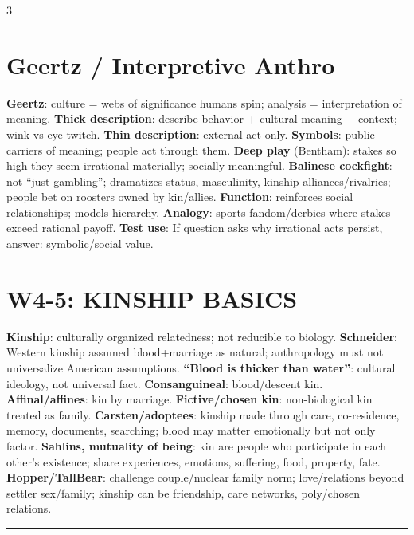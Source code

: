 \documentclass[10pt,landscape]{article}
\newcommand{\kw}[1]{\textbf{#1}}
\newcommand{\sep}{\vspace{0.8pt}\hrule\vspace{0.8pt}}
\begin{document}
\begin{multicols}{3}
\section*{Geertz / Interpretive Anthro}
\kw{Geertz}: culture = webs of significance humans spin; analysis = interpretation of meaning. \kw{Thick description}: describe behavior + cultural meaning + context; wink vs eye twitch. \kw{Thin description}: external act only. \kw{Symbols}: public carriers of meaning; people act through them. \kw{Deep play} (Bentham): stakes so high they seem irrational materially; socially meaningful. \kw{Balinese cockfight}: not ``just gambling''; dramatizes status, masculinity, kinship alliances/rivalries; people bet on roosters owned by kin/allies. \kw{Function}: reinforces social relationships; models hierarchy. \kw{Analogy}: sports fandom/derbies where stakes exceed rational payoff. \kw{Test use}: If question asks why irrational acts persist, answer: symbolic/social value.

\section*{W4-5: KINSHIP BASICS}
\kw{Kinship}: culturally organized relatedness; not reducible to biology. \kw{Schneider}: Western kinship assumed blood+marriage as natural; anthropology must not universalize American assumptions. \kw{``Blood is thicker than water''}: cultural ideology, not universal fact. \kw{Consanguineal}: blood/descent kin. \kw{Affinal/affines}: kin by marriage. \kw{Fictive/chosen kin}: non-biological kin treated as family. \kw{Carsten/adoptees}: kinship made through care, co-residence, memory, documents, searching; blood may matter emotionally but not only factor. \kw{Sahlins, mutuality of being}: kin are people who participate in each other's existence; share experiences, emotions, suffering, food, property, fate. \kw{Hopper/TallBear}: challenge couple/nuclear family norm; love/relations beyond settler sex/family; kinship can be friendship, care networks, poly/chosen relations.
\sep

\end{multicols}
\end{document}
